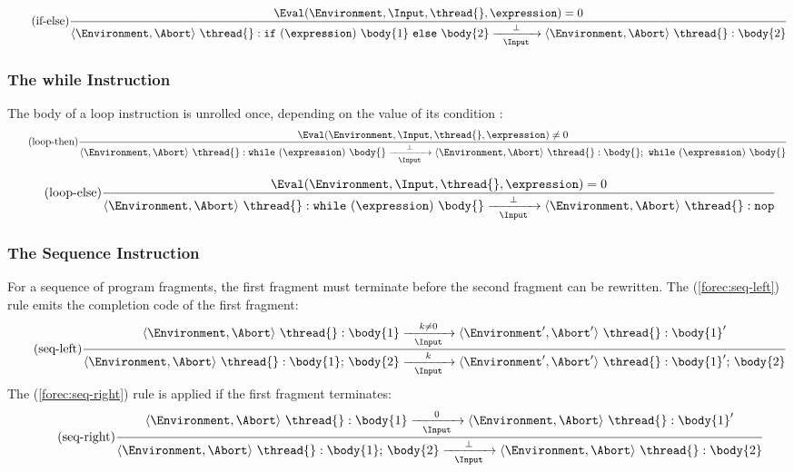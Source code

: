 \begin{equation*}
	\tag{if-else}
	\label{forec:if-else}
	\frac{
			\Eval(\Environment, \Input, \thread{}, \expression) = 0
		}{
			\langle \Environment, \Abort \rangle ~ \thread{}:\mathtt{if}~(\expression)~\body{1}~\mathtt{else}~\body{2}
				\xrightarrow[~~\Input~~]{\bot} 
			\langle \Environment, \Abort \rangle ~ \thread{}:\body{2}
		}
\end{equation*}

\subsubsection{The while Instruction}
The body of a loop instruction is unrolled once, depending 
on the value of its condition \expression{}:
\begin{equation*}
	\tag{loop-then}
	\label{forec:loop-then}
	\frac{
			\Eval(\Environment, \Input, \thread{}, \expression) \neq 0
		}{
			\langle \Environment, \Abort \rangle ~ \thread{}:\mathtt{while}~(\expression)~\body{}
				\xrightarrow[~~\Input~~]{\bot} 
			\langle \Environment, \Abort \rangle ~ \thread{}:\body{};~\mathtt{while}~(\expression)~\body{}
		}
\end{equation*}

\begin{equation*}
	\tag{loop-else}
	\label{forec:loop-else}
	\frac{
			\Eval(\Environment, \Input, \thread{}, \expression) = 0
		}{
			\langle \Environment, \Abort \rangle ~ \thread{}:\mathtt{while}~(\expression)~\body{}
				\xrightarrow[~~\Input~~]{\bot} 
			\langle \Environment, \Abort \rangle ~ \thread{}:\mathtt{nop}
		}
\end{equation*}

\subsubsection{The Sequence Instruction}
For a sequence of program fragments, the first fragment 
must terminate before the second fragment  can be rewritten. 
The (\ref{forec:seq-left}) rule emits the completion code of 
the first fragment:
\begin{equation*}
	\tag{seq-left}
	\label{forec:seq-left}
	\frac{
			\langle \Environment, \Abort \rangle ~ \thread{}:\body{1}
				\xrightarrow[~~\Input~~]{k \neq 0} 
			\langle \Environment', \Abort' \rangle ~ \thread{}:\body{1}'
		}{
			\langle \Environment, \Abort \rangle ~ \thread{}:\body{1}\mathtt{;}~\body{2}
				\xrightarrow[~~\Input~~]{k} 
			\langle \Environment', \Abort' \rangle ~ \thread{}:\body{1}'\mathtt{;}~\body{2}
		}
\end{equation*}
The (\ref{forec:seq-right}) rule is applied if the 
first fragment terminates:
\begin{equation*}
	\tag{seq-right}
	\label{forec:seq-right}
	\frac{
			\langle \Environment, \Abort \rangle ~ \thread{}:\body{1}
				\xrightarrow[~~\Input~~]{0} 
			\langle \Environment, \Abort \rangle ~ \thread{}:\body{1}'
		}{
			\langle \Environment, \Abort \rangle ~ \thread{}:\body{1}\mathtt{;}~\body{2}
				\xrightarrow[~~\Input~~]{\bot} 
			\langle \Environment, \Abort \rangle ~ \thread{}:\body{2}
		}
\end{equation*}

